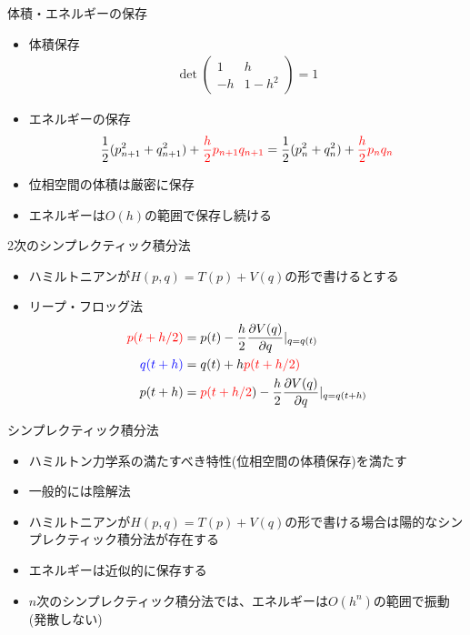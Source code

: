 \documentclass[dvipdfmx]{beamer}
\begin{document}
\begin{frame}[t,fragile]{体積・エネルギーの保存}
  \begin{itemize}
    \setlength{\itemsep}{1em}
  \item 体積保存
    \begin{align*}
      \det \begin{pmatrix} 1 & h \\ -h & 1-h^2 \end{pmatrix} = 1
    \end{align*}
  \item エネルギーの保存
    \begin{align*}
      \frac{1}{2}(p_{n+1}^2+q_{n+1}^2) + {\color{red}\frac{h}{2} p_{n+1} q_{n+1}} = \frac{1}{2}(p_{n}^2+q_{n}^2) + {\color{red}\frac{h}{2} p_{n} q_{n}}
    \end{align*}
  \item 位相空間の体積は厳密に保存
  \item エネルギーは$O(h)$の範囲で保存し続ける
  \end{itemize}
\end{frame}

\begin{frame}[t,fragile]{2次のシンプレクティック積分法}
  \begin{itemize}
    \setlength{\itemsep}{1em}
  \item ハミルトニアンが$H(p,q) = T(p) + V(q)$の形で書けるとする
  \item リープ・フロッグ法
    \begin{align*}
      {\color{red} p(t+h/2)} &= p(t) - \frac{h}{2} \frac{\partial V(q)}{\partial q}|_{q=q(t)} \\
      {\color{blue} q(t+h)} &= q(t) + h {\color{red}p(t+h/2)} \\
      p(t+h) &= {\color{red}p(t+h/2}) - \frac{h}{2} \frac{\partial V(q)}{\partial q}|_{q=q(t+h)}
    \end{align*}
  \end{itemize}
\end{frame}

\begin{frame}[t,fragile]{シンプレクティック積分法}
  \begin{itemize}
    \setlength{\itemsep}{1em}
  \item ハミルトン力学系の満たすべき特性(位相空間の体積保存)を満たす
  \item 一般的には陰解法
  \item ハミルトニアンが$H(p,q) = T(p) + V(q)$の形で書ける場合は陽的なシンプレクティック積分法が存在する
  \item エネルギーは近似的に保存する
  \item $n$次のシンプレクティック積分法では、エネルギーは$O(h^n)$の範囲で振動(発散しない)
  \end{itemize}
\end{frame}
\end{document}
